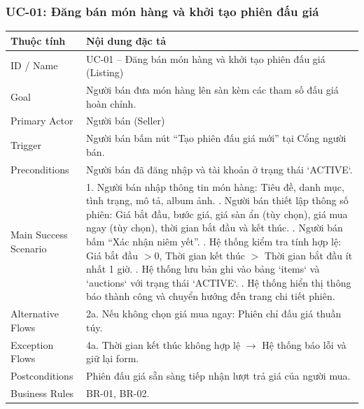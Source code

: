 \documentclass[11pt,a4paper]{article}
\begin{document}
\subsubsection{UC-01: Đăng bán món hàng và khởi tạo phiên đấu giá}
\begin{table}[H]
    \centering
    \small
    \begin{tabularx}{\textwidth}{|l|X|}
        \hline
        \textbf{Thuộc tính} & \textbf{Nội dung đặc tả} \\ \hline
        ID / Name & UC-01 -- Đăng bán món hàng và khởi tạo phiên đấu giá (Listing) \\ \hline
        Goal & Người bán đưa món hàng lên sàn kèm các tham số đấu giá hoàn chỉnh. \\ \hline
        Primary Actor & Người bán (Seller) \\ \hline
        Trigger & Người bán bấm nút ``Tạo phiên đấu giá mới'' tại Cổng người bán. \\ \hline
        Preconditions & Người bán đã đăng nhập và tài khoản ở trạng thái `ACTIVE`. \\ \hline
        Main Success Scenario & 
        1. Người bán nhập thông tin món hàng: Tiêu đề, danh mục, tình trạng, mô tả, album ảnh. \newline
        2. Người bán thiết lập thông số phiên: Giá bắt đầu, bước giá, giá sàn ẩn (tùy chọn), giá mua ngay (tùy chọn), thời gian bắt đầu và kết thúc. \newline
        3. Người bán bấm ``Xác nhận niêm yết''. \newline
        4. Hệ thống kiểm tra tính hợp lệ: Giá bắt đầu $> 0$, Thời gian kết thúc $>$ Thời gian bắt đầu ít nhất 1 giờ. \newline
        5. Hệ thống lưu bản ghi vào bảng `items` và `auctions` với trạng thái `ACTIVE`. \newline
        6. Hệ thống hiển thị thông báo thành công và chuyển hướng đến trang chi tiết phiên. \\ \hline
        Alternative Flows & 2a. Nếu không chọn giá mua ngay: Phiên chỉ đấu giá thuần túy. \\ \hline
        Exception Flows & 4a. Thời gian kết thúc không hợp lệ $\rightarrow$ Hệ thống báo lỗi và giữ lại form. \\ \hline
        Postconditions & Phiên đấu giá sẵn sàng tiếp nhận lượt trả giá của người mua. \\ \hline
        Business Rules & BR-01, BR-02. \\ \hline
    \end{tabularx}
\end{table}
\end{document}
